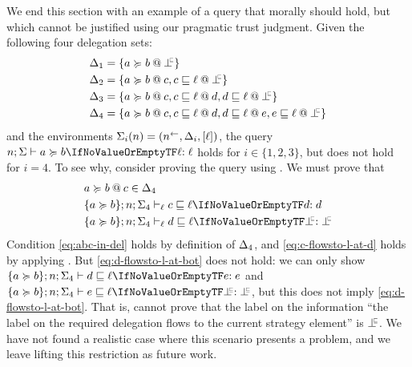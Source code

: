 We end this section with an example of a query that morally should hold, but which cannot be justified using our pragmatic trust judgment. Given the following four delegation sets:
\begin{align*}
\scope_1 &= \{ \lb{\botinfoflow}{a \actsfor b} \} \\
\scope_2 &= \{ \lb{c}{a \actsfor b}, \lb{\botinfoflow}{c \flowsto \level} \} \\
\scope_3 &= \{ \lb{c}{a \actsfor b}, \lb{d}{c \flowsto \level}, \lb{\botinfoflow}{d \flowsto \level} \} \\
\scope_4 &= \{ \lb{c}{a \actsfor b}, \lb{d}{c \flowsto \level}, \lb{e}{d \flowsto \level}, \lb{\botinfoflow}{e \flowsto \level} \}
\end{align*}
and the environments $\Sigma_i(n) = (n^{\leftarrow}, \Delta_i, \lbrack \ell \rbrack)$, the query $\actsforquery{n; \env}{a}{b}{\level}$ holds for $i \in \{1, 2, 3\}$, but does not hold for $i = 4$. To see why, consider proving the query using . We must prove that
\begin{align}
\label{eq:abc-in-del} &\lb{c}{a \actsfor b} \in \scope_4\\
\label{eq:c-flowsto-l-at-d} &\flowstoquery{\{a \actsfor b\}; n; \env_4}[\level]{c}{\level}{d}\\
\label{eq:d-flowsto-l-at-bot} &\flowstoquery{\{a \actsfor b\}; n; \env_4}[\level]{d}{\level}{\botinfoflow}
\end{align}
Condition \eqref{eq:abc-in-del} holds by definition of $\Delta_4$, and \eqref{eq:c-flowsto-l-at-d} holds by applying . But \eqref{eq:d-flowsto-l-at-bot} does not hold: we can only show $\flowstoquery{\{a \actsfor b\}; n; \env_4}{d}{\level}{e}$ and $\flowstoquery{\{a \actsfor b\}; n; \env_4}{e}{\level}{\botinfoflow}$, but this does not imply \eqref{eq:d-flowsto-l-at-bot}. That is, \lang{} cannot prove that the label on the information ``the label on the required delegation flows to the current strategy element'' is $\botinfoflow$. We have not found a realistic case where this scenario presents a problem, and we leave lifting this restriction as future work.

